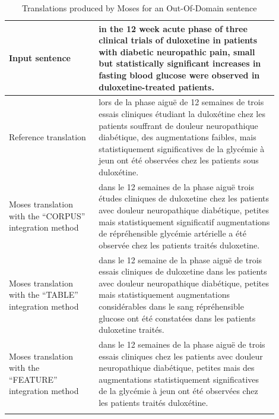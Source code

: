 \documentclass[output=paper,modfonts,nonflat]{langsci/langscibook}
\begin{document}
\begin{table}
\caption{Translations produced by Moses for an Out-Of-Domain sentence}
\label{sem:tab:SMT_ex2}
\small
\centering
 \begin{tabular}{p{0.3\linewidth}p{0.6\linewidth}} 
  \lsptoprule
Input sentence & in the 12 week acute phase of three clinical trials of duloxetine in patients with diabetic neuropathic pain, small but statistically significant increases in fasting blood glucose were observed in duloxetine-treated patients. \\
  \midrule
Reference translation & lors de la phase aiguë de 12 semaines de trois essais cliniques étudiant la duloxétine chez les patients souffrant de douleur neuropathique diabétique, des augmentations faibles, mais statistiquement significatives de la glycémie à jeun ont été observées chez les patients sous duloxétine. \\
  \midrule
Moses translation with the ``CORPUS'' integration method & dans le 12 semaines de la phase aiguë trois études cliniques de duloxetine chez les patients avec douleur neuropathique diabétique, petites mais statistiquement significatif augmentations de répréhensible glycémie artérielle a été observée chez les patients traités duloxetine.\\
  \midrule
Moses translation with the ``TABLE'' integration method & dans le 12 semaine de la phase aiguë de trois essais cliniques de duloxetine dans les patients avec douleur neuropathique diabétique, petites mais statistiquement augmentations considérables dans le sang répréhensible glucose ont été constatées dans les patients duloxetine traités.\\
  \midrule
Moses translation with the ``FEATURE'' integration method & dans le 12 semaines de la phase aiguë de trois essais cliniques chez les patients avec douleur neuropathique diabétique, petites mais des augmentations statistiquement significatives de la glycémie à jeun ont été observées chez les patients traités duloxétine.\\
  \lspbottomrule
 \end{tabular}
\end{table}
\end{document}
